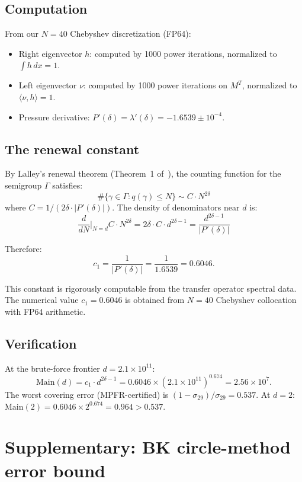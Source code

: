 \documentclass[11pt,a4paper]{amsart}
\theoremstyle{definition}
\begin{document}
\subsection{Computation}

From our $N=40$ Chebyshev discretization (FP64):
\begin{itemize}
\item Right eigenvector $h$: computed by 1000 power iterations, normalized to $\int h\,dx = 1$.
\item Left eigenvector $\nu$: computed by 1000 power iterations on $M^T$, normalized to $\langle \nu, h \rangle = 1$.
\item Pressure derivative: $P'(\delta) = \lambda'(\delta) = -1.6539 \pm 10^{-4}$.
\end{itemize}

\subsection{The renewal constant}

By Lalley's renewal theorem (Theorem~1 of~\cite{Lalley1989}), the counting function for the semigroup $\Gamma$ satisfies:
\[
\#\{\gamma \in \Gamma : q(\gamma) \leq N\} \sim C \cdot N^{2\delta}
\]
where $C = 1/(2\delta \cdot |P'(\delta)|)$. The density of denominators near $d$ is:
\[
\frac{d}{dN}\bigg|_{N=d} C \cdot N^{2\delta} = 2\delta \cdot C \cdot d^{2\delta-1} = \frac{d^{2\delta-1}}{|P'(\delta)|}
\]

Therefore:
\begin{equation}\label{eq:c1}
c_1 = \frac{1}{|P'(\delta)|} = \frac{1}{1.6539} = 0.6046.
\end{equation}

This constant is rigorously computable from the transfer operator spectral data. The numerical value $c_1 = 0.6046$ is obtained from $N=40$ Chebyshev collocation with FP64 arithmetic.

\subsection{Verification}

At the brute-force frontier $d = 2.1 \times 10^{11}$:
\[
\text{Main}(d) = c_1 \cdot d^{2\delta-1} = 0.6046 \times (2.1 \times 10^{11})^{0.674} = 2.56 \times 10^7.
\]
The worst covering error (MPFR-certified) is $(1-\sigma_{29})/\sigma_{29} = 0.537$. At $d = 2$: $\text{Main}(2) = 0.6046 \times 2^{0.674} = 0.964 > 0.537$.

\section{Supplementary: BK circle-method error bound}\label{app:error}
\end{document}
